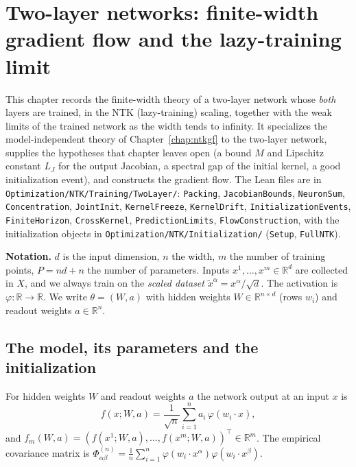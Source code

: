 \chapter{Two-layer networks: finite-width gradient flow and the lazy-training limit}\label{chap:ntktl}

This chapter records the finite-width theory of a two-layer network whose \emph{both} layers are trained, in the NTK
(lazy-training) scaling, together with the weak limits of the trained network as the width tends to infinity.
It specializes the model-independent theory of Chapter~\ref{chap:ntkgf} to the two-layer network, supplies the hypotheses
that chapter leaves open (a bound $M$ and Lipschitz constant $L_J$ for the output Jacobian, a spectral gap of the initial kernel,
a good initialization event), and constructs the gradient flow.
The Lean files are in \texttt{Optimization/NTK/Training/TwoLayer/}: \texttt{Packing}, \texttt{JacobianBounds},
\texttt{NeuronSum}, \texttt{Concentration}, \texttt{JointInit}, \texttt{KernelFreeze}, \texttt{KernelDrift},
\texttt{InitializationEvents}, \texttt{FiniteHorizon}, \texttt{CrossKernel}, \texttt{PredictionLimits},
\texttt{FlowConstruction}, with the initialization objects in \texttt{Optimization/NTK/Initialization/}
(\texttt{Setup}, \texttt{FullNTK}).

\medskip\noindent\textbf{Notation.}
$d$ is the input dimension, $n$ the width, $m$ the number of training points, $P=nd+n$ the number of parameters.
Inputs $x^1,\dots,x^m\in\mathbb R^d$ are collected in $X$, and we always train on the \emph{scaled dataset}
$\tilde x^\alpha=x^\alpha/\sqrt d$. The activation is $\varphi:\mathbb R\to\mathbb R$. We write $\theta=(W,a)$ with hidden weights
$W\in\mathbb R^{n\times d}$ (rows $w_i$) and readout weights $a\in\mathbb R^n$.


\section{The model, its parameters and the initialization}\label{sec:ntktl:model}

\begin{definition}\label{def:ntktl:network}
  \leanok
For hidden weights $W$ and readout weights $a$ the network output at an input $x$ is
\[
  f(x;W,a)=\frac1{\sqrt n}\sum_{i=1}^na_i\,\varphi(w_i\cdot x),
\]
and $f_m(W,a)=(f(x^1;W,a),\dots,f(x^m;W,a))^\top\in\mathbb R^m$. The empirical covariance matrix is
$\Phi^{(n)}_{\alpha\beta}=\frac1n\sum_{i=1}^n\varphi(w_i\cdot x^\alpha)\varphi(w_i\cdot x^\beta)$.
\end{definition}

